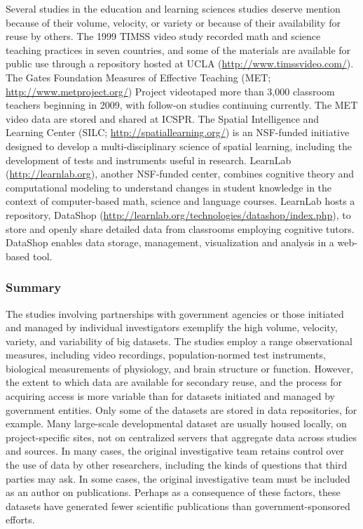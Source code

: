 \documentclass[letterpaper,man,apacite,natbib]{apa6}
\begin{document}
Several studies in the education and learning sciences studies deserve mention because of their volume, velocity, or variety or because of their availability for reuse by others.
The 1999 TIMSS video study recorded math and science teaching practices in seven countries, and some of the materials are available for public use through a repository hosted at UCLA (\url{http://www.timssvideo.com/}).
The Gates Foundation Measures of Effective Teaching (MET; \url{http://www.metproject.org/}) Project videotaped more than 3,000 classroom teachers beginning in 2009, with follow-on studies continuing currently.
The MET video data are stored and shared at ICSPR.
The Spatial Intelligence and Learning Center (SILC; \url{http://spatiallearning.org/}) is an NSF-funded initiative designed to develop a multi-disciplinary science of spatial learning, including the development of tests and instruments useful in research.
LearnLab (\url{http://learnlab.org}), another NSF-funded center, combines cognitive theory and computational modeling to understand changes in student knowledge in the context of computer-based math, science and language courses. 
LearnLab hosts a repository, DataShop (\url{http://learnlab.org/technologies/datashop/index.php}), to store and openly share detailed data from classrooms employing cognitive tutors.
DataShop enables data storage, management, visualization and analysis in a web-based tool.

\subsubsection{Summary}

The studies involving partnerships with government agencies or those initiated and managed by individual investigators exemplify the high volume, velocity, variety, and variability of big datasets.
The studies employ a range observational measures, including video recordings, population-normed test instruments, biological measurements of physiology, and brain structure or function.
However, the extent to which data are available for secondary reuse, and the process for acquiring access is more variable than for datasets initiated and managed by government entities.
Only some of the datasets are stored in data repositories, for example.
Many large-scale developmental dataset are usually housed locally, on project-specific sites, not on centralized servers that aggregate data across studies and sources.
In many cases, the original investigative team retains control over the use of data by other researchers, including the kinds of questions that third parties may ask.
In some cases, the original investigative team must be included as an author on publications.
Perhaps as a consequence of these factors, these datasets have generated fewer scientific publications than government-sponsored efforts.
\end{document}
